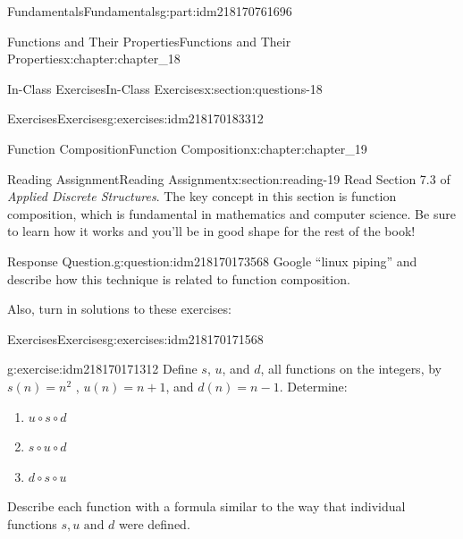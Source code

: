 \documentclass[oneside,10pt,]{book}
\numberwithin{equation}{section}
\begin{document}
\begin{partptx}{Fundamentals}{}{Fundamentals}{}{}{g:part:idm218170761696}
\begin{chapterptx}{Functions and Their Properties}{}{Functions and Their Properties}{}{}{x:chapter:chapter_18}
\begin{sectionptx}{In-Class Exercises}{}{In-Class Exercises}{}{}{x:section:questions-18}
\begin{exercises-subsection-numberless}{Exercises}{}{Exercises}{}{}{g:exercises:idm218170183312}
\begin{exercisegroup}
\end{exercisegroup}
\par\medskip\noindent
\end{exercises-subsection-numberless}
\end{sectionptx}
\end{chapterptx}
%
\typeout{************************************************}
\typeout{************************************************}
%
\begin{chapterptx}{Function Composition}{}{Function Composition}{}{}{x:chapter:chapter_19}
%
%
%
\typeout{************************************************}
\typeout{************************************************}
%
\begin{sectionptx}{Reading Assignment}{}{Reading Assignment}{}{}{x:section:reading-19}
Read Section 7.3 of \emph{Applied Discrete Structures}.  The key concept in this section is function composition, which is fundamental in mathematics and computer science. Be sure to learn how it works and you'll be in good shape for the rest of the book!%
\begin{question}{Response Question.}{g:question:idm218170173568}%
Google ``linux piping'' and describe how this technique is related to function composition.%
\end{question}
Also, turn in solutions to these exercises:%
%
%
\typeout{************************************************}
\typeout{************************************************}
%
\begin{exercises-subsection-numberless}{Exercises}{}{Exercises}{}{}{g:exercises:idm218170171568}
\par\medskip\noindent%
%
\begin{exercisegroup}
\begin{divisionexerciseeg}{1}{}{}{g:exercise:idm218170171312}%
Define \(s\), \(u\), and \(d\), all functions on the integers, by \(s(n) = n^2\) , \(u(n) = n + 1\), and \(d(n) = n-1\). Determine:%
\begin{enumerate}[label=(\alph*)]
\item{}\(\displaystyle u \circ  s \circ  d\)%
\item{}\(\displaystyle s \circ  u\circ  d\)%
\item{}\(\displaystyle d \circ  s \circ  u\)%
\end{enumerate}
Describe each function with a formula similar to the way that individual functions \(s, u \textrm{ and } d\) were defined.%

\end{divisionexerciseeg}
\end{exercisegroup}
\end{exercises-subsection-numberless}
\end{sectionptx}
\end{chapterptx}
\end{partptx}
\end{document}
